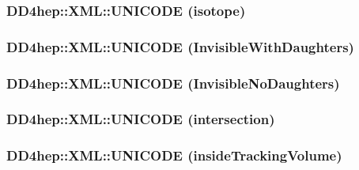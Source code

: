 \label{namespace_d_d4hep_1_1_x_m_l_a361a5dd420db207570ade65425be05e2}
\hypertarget{namespace_d_d4hep_1_1_x_m_l_a56f93391cd06d15047599fd53541e8e7}{
\subsubsection[{UNICODE}]{\setlength{\rightskip}{0pt plus 5cm}DD4hep::XML::UNICODE (isotope)}}
\label{namespace_d_d4hep_1_1_x_m_l_a56f93391cd06d15047599fd53541e8e7}
\hypertarget{namespace_d_d4hep_1_1_x_m_l_a9e9ef0fa1a9d0ff3b077169b722887fd}{
\subsubsection[{UNICODE}]{\setlength{\rightskip}{0pt plus 5cm}DD4hep::XML::UNICODE (InvisibleWithDaughters)}}
\label{namespace_d_d4hep_1_1_x_m_l_a9e9ef0fa1a9d0ff3b077169b722887fd}
\hypertarget{namespace_d_d4hep_1_1_x_m_l_abc8efddf185faa2be9c966015e442261}{
\subsubsection[{UNICODE}]{\setlength{\rightskip}{0pt plus 5cm}DD4hep::XML::UNICODE (InvisibleNoDaughters)}}
\label{namespace_d_d4hep_1_1_x_m_l_abc8efddf185faa2be9c966015e442261}
\hypertarget{namespace_d_d4hep_1_1_x_m_l_a597e217c746431268c6b96122c13fc75}{
\subsubsection[{UNICODE}]{\setlength{\rightskip}{0pt plus 5cm}DD4hep::XML::UNICODE (intersection)}}
\label{namespace_d_d4hep_1_1_x_m_l_a597e217c746431268c6b96122c13fc75}
\hypertarget{namespace_d_d4hep_1_1_x_m_l_a3ae595669e40f727e23c89d11612b7a5}{
\subsubsection[{UNICODE}]{\setlength{\rightskip}{0pt plus 5cm}DD4hep::XML::UNICODE (insideTrackingVolume)}}
\label{namespace_d_d4hep_1_1_x_m_l_a3ae595669e40f727e23c89d11612b7a5}
